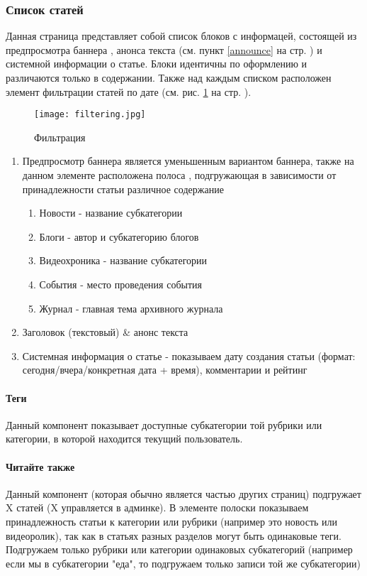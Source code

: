\documentclass[DIV=calc, paper=a4, fontsize=11pt]{scrartcl} %
\begin{document}
\subsubsection{Список статей}
Данная страница представляет собой список блоков с информацей, состоящей из предпросмотра баннера , анонса текста (см. пункт \ref{announce} на стр. \pageref{announce}) и системной информации о статье. Блоки идентичны по оформлению и различаются только в содержании. Также над каждым списком расположен элемент фильтрации статей по дате (см. рис. \ref{fig:filtering.jpg} на стр. \pageref{fig:filtering.jpg}).
            \begin{figure}[ht!]
            \centering
            \texttt{[image: filtering.jpg]}
            \caption{Фильтрация \label{fig:filtering.jpg}}
            \end{figure}
\begin{enumerate}
    \item Предпросмотр баннера является уменьшенным вариантом баннера, также на данном элементе расположена полоса \label{whiteline}, подгружающая в зависимости от принадлежности статьи различное содержание
    \begin{enumerate}
        \item Новости - название субкатегории
        \item Блоги - автор и субкатегорию блогов
        \item Видеохроника - название субкатегории
        \item События - место проведения события
        \item Журнал - главная тема архивного журнала
    \end{enumerate}
    \item Заголовок (текстовый) \& анонс текста
    \item Системная информация о статье - показываем дату создания статьи (формат: сегодня/вчера/конкретная дата + время), комментарии и рейтинг
\end{enumerate}

\paragraph{Теги}
Данный компонент показывает доступные субкатегории той рубрики или категории, в которой находится текущий пользователь.

\paragraph{Читайте также}
Данный компонент (которая обычно является частью других страниц) подгружает X статей (X управляется в админке). В элементе полоски показываем принадлежность статьи к категории или рубрики (например это новость или видеоролик), так как в статьях разных разделов могут быть одинаковые теги. Подгружаем только рубрики или категории одинаковых субкатегорий (например если мы в субкатегории "еда", то подгружаем только записи той же субкатегории)
\end{document}

